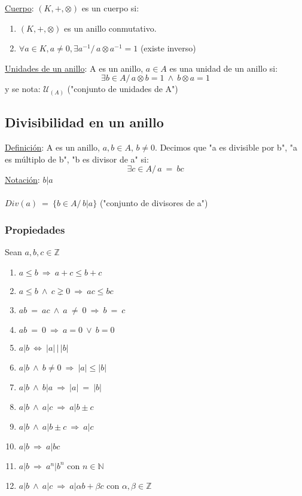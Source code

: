 \documentclass{article}
\newcommand{\lands}{\:\land\:}                          %
\newcommand{\comma}{,\,}                                %
\newcommand{\tq}{/\,}                                   %
\newcommand{\vees}{\:\vee\:}                            %
\newcommand{\eq}{\:=\:}                                 %
\newcommand{\neqs}{\:\neq\:}                            %
\newcommand{\Rightarrows}{\: \Rightarrow \:}            %
\newcommand{\Leftrightarrows}{\: \Leftrightarrow \:}    %
\begin{document}
\underline{Cuerpo}: $(K, +, \otimes)$ es un cuerpo si: 
\begin{enumerate}
    \item $(K, +, \otimes)$ es un anillo conmutativo.
    \item $\forall a \in K, a \neq 0, \exists a^{-1} \tq a \otimes a^{-1} = 1$ (existe inverso)
\end{enumerate}
\underline{Unidades de un anillo}: A es un anillo, $a \in A$ es una unidad de un anillo si:
\begin{equation*}
    \exists b \in A \tq a \otimes b = 1 \lands b \otimes a = 1
\end{equation*}
y se nota: $\mathcal{U}_{(A)}$ ("conjunto de unidades de A")

\subsection{Divisibilidad en un anillo}
\underline{Definición}: A es un anillo, $a, b \in A\comma b \neq 0$. Decimos que "a es divisible por b", "a es múltiplo de b", "b es divisor de a" si:
\begin{equation*}
    \exists c \in A \tq a \eq bc
\end{equation*}
\underline{Notación}: $b | a$
\\
\\ $Div(a) \eq \{ b \in A \tq b|a \}$ ("conjunto de divisores de a")
\subsubsection*{Propiedades}
Sean $a, b, c \in \mathbb{Z}$ 
\begin{enumerate}
    \item $a \leq b \Rightarrows a + c \leq b + c$
    \item $a \leq b \lands c \gneq 0 \Rightarrows ac \leq bc$ 
    \item $ab \eq ac \lands a \neqs 0 \Rightarrows  b \eq c$
    \item $ab \eq 0 \Rightarrows a = 0 \vees b = 0$
    \item $a|b \Leftrightarrows |a|\,|\,|b|$
    \item $a|b \lands b \neq 0 \Rightarrows |a| \leq |b|$
    \item $a|b \lands b|a \Rightarrows |a| \eq |b|$
    \item $a|b \lands a|c \Rightarrows a | b \pm c$ 
    \item $a|b \lands a|b \pm c \Rightarrows a|c$
    \item $a|b \Rightarrows a|bc$
    \item $a|b \Rightarrows a^n | b^n$ con $n \in \mathbb{N}$
    \item $a|b \lands a|c \Rightarrows a|\alpha b+\beta c$ con $\alpha, \beta \in \mathbb{Z}$
\end{enumerate}
\end{document}
